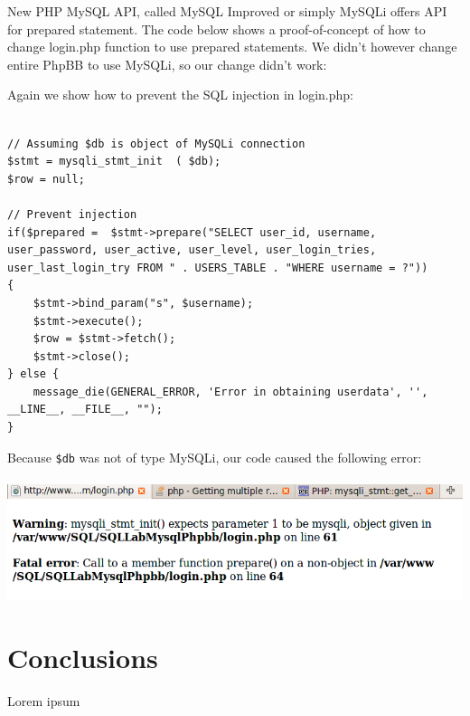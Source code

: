 \documentclass[12pt, a4paper, pdflatex]{article}
\begin{document}
New PHP MySQL API, called MySQL Improved or simply MySQLi\cite{mysqli} offers API for prepared statement. The code below shows a proof-of-concept of how to change login.php function to use prepared statements. We didn't however change entire PhpBB to use MySQLi, so our change didn't work:

Again we show how to prevent the SQL injection in login.php:
\lstset{
	captionpos=b,
	frame=single,
	language=PHP,
	breaklines=true,
	label=sqladdslash
}
\begin{lstlisting}	

// Assuming $db is object of MySQLi connection
$stmt = mysqli_stmt_init  ( $db);
$row = null;

// Prevent injection
if($prepared =  $stmt->prepare("SELECT user_id, username, user_password, user_active, user_level, user_login_tries, user_last_login_try FROM " . USERS_TABLE . "WHERE username = ?"))
{
	$stmt->bind_param("s", $username);
	$stmt->execute();
	$row = $stmt->fetch();
	$stmt->close();
} else {
	message_die(GENERAL_ERROR, 'Error in obtaining userdata', '', __LINE__, __FILE__, "");
}
\end{lstlisting}

Because \texttt{\$db} was not of type MySQLi, our code caused the following error:\\\\
\includegraphics{gfx/sql/mysqli.png}
\section{Conclusions}

Lorem ipsum
\vfill


\end{document}
